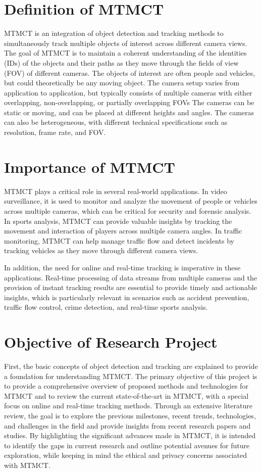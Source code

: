 \section{Definition of MTMCT}\label{sec:definition_of_mtmct}
MTMCT is an integration of object detection and tracking methods to simultaneously track multiple objects of interest across different camera views. The goal of MTMCT is to maintain a coherent understanding of the identities (IDs) of the objects and their paths as they move through the fields of view (FOV) of different cameras. The objects of interest are often people and vehicles, but could theoretically be any moving object. The camera setup varies from application to application, but typically consists of multiple cameras with either overlapping, non-overlapping, or partially overlapping FOVs The cameras can be static or moving, and can be placed at different heights and angles. The cameras can also be heterogeneous, with different technical specifications such as resolution, frame rate, and FOV.

\section{Importance of MTMCT}\label{sec:importance_of_mtmct}
MTMCT plays a critical role in several real-world applications. In video surveillance, it is used to monitor and analyze the movement of people or vehicles across multiple cameras, which can be critical for security and forensic analysis. In sports analysis, MTMCT can provide valuable insights by tracking the movement and interaction of players across multiple camera angles. In traffic monitoring, MTMCT can help manage traffic flow and detect incidents by tracking vehicles as they move through different camera views.

In addition, the need for online and real-time tracking is imperative in these applications. Real-time processing of data streams from multiple cameras and the provision of instant tracking results are essential to provide timely and actionable insights, which is particularly relevant in scenarios such as accident prevention, traffic flow control, crime detection, and real-time sports analysis.

\section{Objective of Research Project}\label{sec:objective_of_review}
First, the basic concepts of object detection and tracking are explained to provide a foundation for understanding MTMCT. The primary objective of this project is to provide a comprehensive overview of proposed methods and technologies for MTMCT and to review the current state-of-the-art in MTMCT, with a special focus on online and real-time tracking methods. Through an extensive literature review, the goal is to explore the previous milestones, recent trends, technologies, and challenges in the field and provide insights from recent research papers and studies. By highlighting the significant advances made in MTMCT, it is intended to identify the gaps in current research and outline potential avenues for future exploration, while keeping in mind the ethical and privacy concerns associated with MTMCT.

